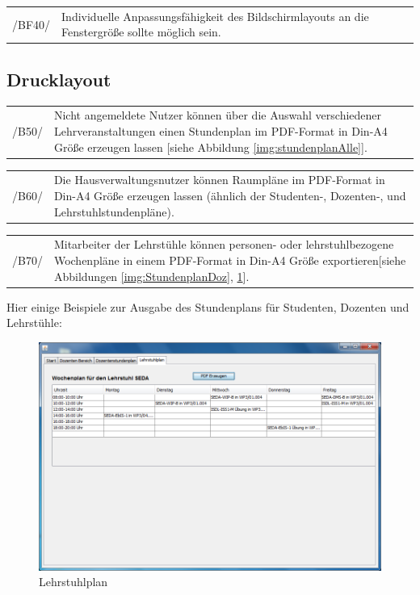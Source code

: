 \begin{tabular}{p{1.5cm}p{14.5cm}}
 /BF40/	& Individuelle Anpassungsfähigkeit des Bildschirmlayouts an die Fenstergröße sollte möglich sein. \\[0.25cm]	 
\end{tabular}

\subsection{Drucklayout}

\begin{tabular}{p{1.5cm}p{14.5cm}}
 /B50/	& Nicht angemeldete Nutzer können über die Auswahl verschiedener Lehrveranstaltungen einen Stundenplan im PDF-Format in Din-A4 Größe erzeugen lassen [siehe Abbildung \ref{img:stundenplanAlle}]. \\[0.25cm]	 
\end{tabular}

\begin{tabular}{p{1.5cm}p{14.5cm}}
 /B60/	& Die Hausverwaltungsnutzer können Raumpläne im PDF-Format in Din-A4 Größe erzeugen lassen (ähnlich der Studenten-, Dozenten-, und Lehrstuhlstundenpläne). \\[0.25cm]	 
\end{tabular}

\begin{tabular}{p{1.5cm}p{14.5cm}}
 /B70/	& Mitarbeiter der Lehrstühle können personen- oder lehrstuhlbezogene Wochenpläne in einem PDF-Format in Din-A4 Größe exportieren[siehe Abbildungen \ref{img:StundenplanDoz}, \ref{img:LehrstuhlplanDoz}]. \\[0.25cm]	 
\end{tabular}

Hier einige Beispiele zur Ausgabe des Stundenplans für Studenten, Dozenten und Lehrstühle:
\begin{figure}[H]
\begin{center}
\includegraphics[width=150mm]{images/section_7/DozentenLehrstuhlplan.PNG}
\caption{Lehrstuhlplan}
\label{img:LehrstuhlplanDoz}
\end{center}
\end{figure}

